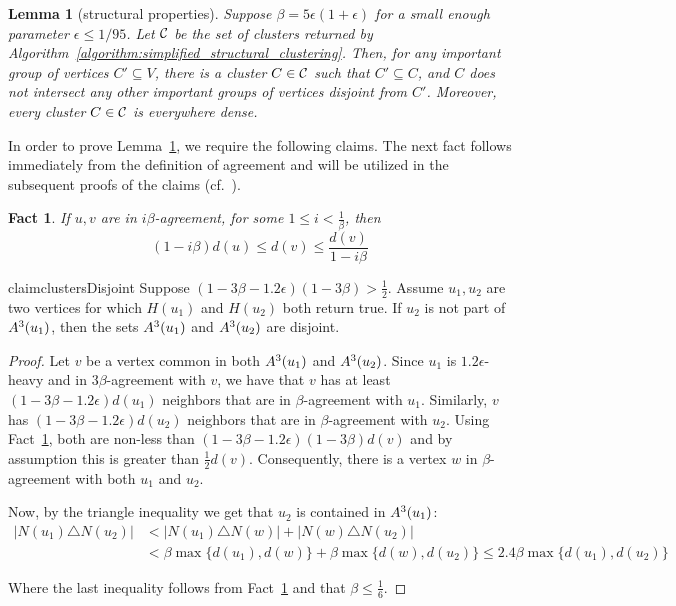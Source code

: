 \documentclass{article}
\newtheorem{lemma}[theorem]{Lemma}
\newtheorem{fact}[theorem]{Fact}
\begin{document}
\begin{lemma} [structural properties]
\label{theorem:structural_properties}
    Suppose $\beta = 5\epsilon(1+\epsilon)$ for a small enough parameter $\epsilon \leq 1/95$. Let $\mathcal{C}$ be the set of clusters returned by Algorithm~\ref{algorithm:simplified_structural_clustering}. Then, for any important group of vertices $C' \subseteq V$, there is a cluster $C \in \mathcal{C}$ such that $C' \subseteq C$, and $C$ does not intersect any other important groups of vertices disjoint from $C'$. Moreover, every
    cluster $C \in \mathcal{C}$ is everywhere dense.
\end{lemma}

In order to prove Lemma~\ref{theorem:structural_properties}, we require the following claims. The next fact follows immediately from the definition of agreement and will be utilized in the subsequent proofs of the claims (cf.~\cite{cohen2021correlation}).

\begin{fact}\label{fact:agreement_facts}
    If $u,v$ are in $i\beta$-agreement, for some $1 \leq i < \frac{1}{\beta}$, then
    \[
    (1-i\beta)d(u) \leq d(v) \leq \frac{d(v)}{1-i\beta}
    \]
\end{fact}

\begin{restatable}{claim}{clustersDisjoint}
\label{claim:clusters_disjoint}
Suppose $(1-3\beta-1.2\epsilon)(1-3\beta) > \frac{1}{2}$.
Assume $u_1, u_2$ are two vertices for which $H(u_1)$ and $H(u_2)$ both return true. 
If $u_2$ is not part of $A^3(u_1)$, then the sets $A^3(u_1)$ and $A^3(u_2)$ are disjoint.
\end{restatable}

\begin{proof}
Let $v$ be a vertex common in both $A^3(u_1)$ and $A^3(u_2)$.
Since $u_1$ is $1.2\epsilon$-heavy and in $3\beta$-agreement with $v$, we have that $v$ has at least $(1-3\beta-1.2\epsilon)d(u_1)$ neighbors that are in $\beta$-agreement with $u_1$.
Similarly, $v$ has $(1-3\beta-1.2\epsilon)d(u_2)$ neighbors that are in $\beta$-agreement with $u_2$.
Using Fact~\ref{fact:agreement_facts}, both are non-less than $(1-3\beta-1.2\epsilon)(1-3\beta)d(v)$ and by assumption this is greater than $\frac{1}{2}d(v)$. Consequently, there is a vertex $w$ in $\beta$-agreement with both $u_1$ and $u_2$.

Now, by the triangle inequality we get that $u_2$ is contained in $A^3(u_1)$:
\begin{align*}
|N(u_1)\triangle N(u_2)|
&< |N(u_1)\triangle N(w)| + |N(w)\triangle N(u_2)| \\
&< \beta\max\{d(u_1), d(w)\} + \beta\max\{d(w), d(u_2)\} \leq 2.4\beta \max\{d(u_1), d(u_2)\}
\end{align*}

\noindent Where the last inequality follows from Fact~\ref{fact:agreement_facts} and that $\beta \leq \frac{1}{6}$.
\end{proof}
\end{document}

